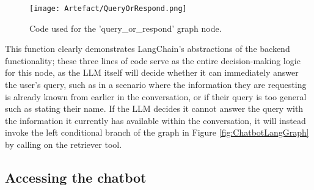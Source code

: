 \begin{figure}[H]
    \centering
    \texttt{[image: Artefact/QueryOrRespond.png]}
    \caption{Code used for the 'query\_or\_respond' graph node. \label{fig:QueryOrRespond}}
\end{figure}

\noindent This function clearly demonstrates LangChain's abstractions of the backend functionality; these three lines of code
serve as the entire decision-making logic for this node, as the LLM itself will decide whether it can immediately answer the user's query,
such as in a scenario where the information they are requesting is already known from earlier in the conversation, or if their query is too 
general such as stating their name. If the LLM decides it cannot answer the query with the information it currently has available within 
the conversation, it will instead invoke the left conditional branch of the graph in Figure \ref{fig:ChatbotLangGraph} by calling on the 
retriever tool.


\subsection{Accessing the chatbot}\label{sec:ChatbotFrontend}

